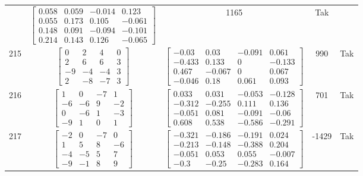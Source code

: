 \documentclass[a4paper,12pt]{article}
\begin{document}
\begin{tabular}{c c c c c}
&
$\begin{bmatrix} 0.058 & 0.059 & -0.014 & 0.123 \\ 0.055 & 0.173 & 0.105 & -0.061 \\ 0.148 & 0.091 & -0.094 & -0.101 \\ 0.214 & 0.143 & 0.126 & -0.065 \end{bmatrix}$
&
1165
&
Tak
\\
215
&
$\begin{bmatrix} 0 & 2 & 4 & 0 \\ 2 & 6 & 6 & 3 \\ -9 & -4 & -4 & 3 \\ 2 & -8 & -7 & 3 \end{bmatrix}$
&
$\begin{bmatrix} -0.03 & 0.03 & -0.091 & 0.061 \\ -0.433 & 0.133 & 0 & -0.133 \\ 0.467 & -0.067 & 0 & 0.067 \\ -0.046 & 0.18 & 0.061 & 0.093 \end{bmatrix}$
&
990
&
Tak
\\
216
&
$\begin{bmatrix} 1 & 0 & -7 & 1 \\ -6 & -6 & 9 & -2 \\ 0 & -6 & 1 & -3 \\ -9 & 1 & 0 & 1 \end{bmatrix}$
&
$\begin{bmatrix} 0.033 & 0.031 & -0.053 & -0.128 \\ -0.312 & -0.255 & 0.111 & 0.136 \\ -0.051 & 0.081 & -0.091 & -0.06 \\ 0.608 & 0.538 & -0.586 & -0.291 \end{bmatrix}$
&
701
&
Tak
\\
217
&
$\begin{bmatrix} -2 & 0 & -7 & 0 \\ 1 & 5 & 8 & -6 \\ -4 & -5 & 5 & 7 \\ -9 & -1 & 8 & 9 \end{bmatrix}$
&
$\begin{bmatrix} -0.321 & -0.186 & -0.191 & 0.024 \\ -0.213 & -0.148 & -0.388 & 0.204 \\ -0.051 & 0.053 & 0.055 & -0.007 \\ -0.3 & -0.25 & -0.283 & 0.164 \end{bmatrix}$
&
-1429
&
Tak
\\

\end{tabular}
\end{document}
